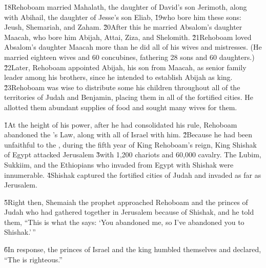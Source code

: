 \v{18}Rehoboam married Mahalath, the daughter of David's son Jerimoth, along with Abihail, the daughter of Jesse's son Eliab, \v{19}who bore him these sons: Jeush, Shemariah, and Zaham. \v{20}After this he married Absalom's daughter Maacah, who bore him Abijah, Attai, Ziza, and Shelomith. \v{21}Rehoboam loved Absalom's daughter Maacah more than he did all of his wives and mistresses. (He married eighteen wives and 60 concubines, fathering 28 sons and 60 daughters.) \v{22}Later, Rehoboam appointed Abijah, his son from Maacah, as senior family leader among his brothers, since he intended to establish Abijah as king. \v{23}Rehoboam was wise to distribute some his children throughout all of the territories of Judah and Benjamin, placing them in all of the fortified cities. He allotted them abundant supplies of food and sought many wives for them.

\v{1}At the height of his power, after he had consolidated his rule, Rehoboam abandoned the 's Law, along with all of Israel with him. \v{2}Because he had been unfaithful to the , during the fifth year of King Rehoboam's reign, King Shishak of Egypt attacked Jerusalem \v{3}with 1,200 chariots and 60,000 cavalry. The Lubim, Sukkiim, and the Ethiopians who invaded from Egypt with Shishak were innumerable. \v{4}Shishak captured the fortified cities of Judah and invaded as far as Jerusalem.

\v{5}Right then, Shemaiah the prophet approached Rehoboam and the princes of Judah who had gathered together in Jerusalem because of Shishak, and he told them, ``This is what the  says: `You abandoned me, so I've abandoned you to Shishak.'\,''

\v{6}In response, the princes of Israel and the king humbled themselves and declared, ``The  is righteous.''

